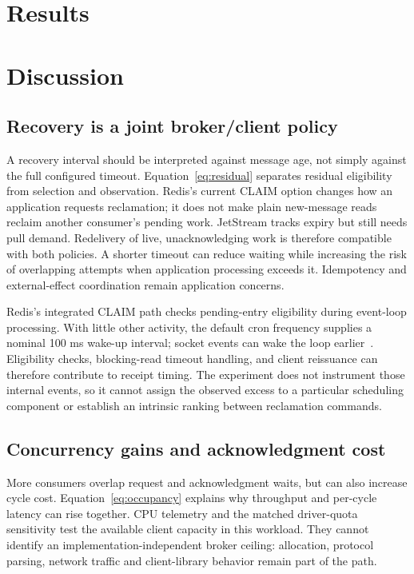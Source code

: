 \documentclass[11pt]{article}
\theoremstyle{definition}
\begin{document}
\section{Results}\label{sec:results}


\section{Discussion}\label{sec:discussion}

\subsection{Recovery is a joint broker/client policy}

A recovery interval should be interpreted against message age, not simply against the full configured timeout. Equation~\ref{eq:residual} separates residual eligibility from selection and observation. Redis's current CLAIM option changes how an application requests reclamation; it does not make plain new-message reads reclaim another consumer's pending work. JetStream tracks expiry but still needs pull demand. Redelivery of live, unacknowledging work is therefore compatible with both policies. A shorter timeout can reduce waiting while increasing the risk of overlapping attempts when application processing exceeds it. Idempotency and external-effect coordination remain application concerns.

Redis's integrated CLAIM path checks pending-entry eligibility during event-loop processing. With little other activity, the default cron frequency supplies a nominal 100 ms wake-up interval; socket events can wake the loop earlier~\cite{redis8102stream,redis8102scheduling}. Eligibility checks, blocking-read timeout handling, and client reissuance can therefore contribute to receipt timing. The experiment does not instrument those internal events, so it cannot assign the observed excess to a particular scheduling component or establish an intrinsic ranking between reclamation commands.

\subsection{Concurrency gains and acknowledgment cost}

More consumers overlap request and acknowledgment waits, but can also increase cycle cost. Equation~\ref{eq:occupancy} explains why throughput and per-cycle latency can rise together. CPU telemetry and the matched driver-quota sensitivity test the available client capacity in this workload. They cannot identify an implementation-independent broker ceiling: allocation, protocol parsing, network traffic and client-library behavior remain part of the path.
\end{document}
